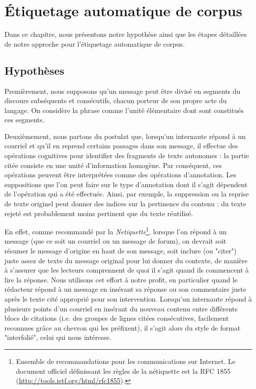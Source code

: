 
\chapter{Étiquetage automatique de corpus}

\label{ch:methodology_for_automatic_corpora_annotation}

Dans ce chapitre, nous présentons notre hypothèse ainsi que les étapes détaillées de notre approche pour l'étiquetage automatique de corpus.

\section{Hypothèses}

Premièrement, nous supposons qu'un message peut être divisé en segments du discours subséquents et consécutifs, chacun porteur de son propre acte du langage. On considère la phrase comme l'unité élémentaire dont sont constitués ces segments. 

Deuxièmement, nous partons du postulat que, lorsqu'un internaute répond à un courriel et qu'il en reprend certains passages dans son message, il effectue des opérations cognitives pour identifier des fragments de texte autonomes : la partie citée consiste en une unité d'information homogène. Par conséquent, ces opérations peuvent être interprétées comme des opérations d'annotation. Les suppositions que l'on peut faire sur le type d'annotation dont il s'agit dépendent de l'opération qui a été effectuée. Ainsi, par exemple, la suppression ou la reprise de texte originel peut donner des indices sur la pertinence du contenu : du texte rejeté est probablement moins pertinent que du texte réutilisé.

En effet, comme recommandé par la \textit{Netiquette}\footnote{Ensemble de recommandations pour les communications sur Internet. Le document officiel définissant les règles de la nétiquette est la RFC 1855 (\url{http://tools.ietf.org/html/rfc1855}).}, lorsque l'on répond à un message (que ce soit un courriel ou un message de forum), on devrait soit résumer le message d'origine en haut de son message, soit inclure (ou "citer") juste assez de texte du message original pour lui donner du contexte, de manière à s'assurer que les lecteurs comprennent de quoi il s'agit quand ils commencent à lire la réponse. Nous utilisons cet effort à notre profit, en particulier quand le rédacteur répond à un message en insérant sa réponse ou son commentaire juste après le texte cité approprié pour son intervention. Lorsqu'un internaute répond à plusieurs points d'un courriel en insérant du nouveau contenu entre différents blocs de citations (i.e. des groupes de lignes citées consécutives, facilement reconnues grâce au chevron qui les préfixent), il s'agit alors du style de format "interfolié", celui qui nous intéresse.

